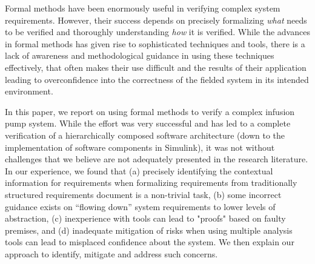 Formal methods have been enormously useful in verifying complex system requirements. However, their success depends on precisely formalizing {\em what} needs to be verified and thoroughly understanding {\em how} it is verified. While the advances in formal methods has given rise to sophisticated techniques and tools, there is a lack of awareness and methodological guidance in using these techniques effectively, that often makes their use difficult and the results of their application leading to overconfidence into the correctness of the fielded system in its intended environment.

In this paper, we report on using formal methods to verify a complex infusion pump system.  While the effort was very successful and has led to a complete verification of a hierarchically composed software architecture (down to the implementation of software components in Simulink), it was not without challenges that we believe are not adequately presented in the research literature. In our experience, we found that (a) precisely identifying the contextual information for requirements when formalizing requirements from traditionally structured requirements document is a non-trivial task, (b) some incorrect guidance exists on ``flowing down'' system requirements to lower levels of abstraction, (c) inexperience with tools can lead to "proofs" based on faulty premises, and (d) inadequate mitigation of risks when using multiple analysis tools can lead to misplaced confidence about the system. We then explain our approach to identify, mitigate and address such concerns.

%

